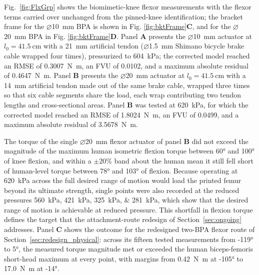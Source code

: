 Fig.~\ref{fig:FlxGrp} shows the biomimetic-knee flexor measurements with the flexor terms carried over unchanged from the pinned-knee identification; the bracket frame for the $\diameter$\qty{10}{\mm} BPA is shown in Fig. \ref{fig:bktFrame}\textbf{C}, and for the $\diameter$\qty{20}{\mm} BPA in Fig. \ref{fig:bktFrame}\textbf{D}. Panel \textbf{A} presents the $\diameter$\qty{10}{\mm} actuator at $l_{0}=\qty{41.5}{\cm}$ with a \qty{21}{\mm} artificial tendon ($\diameter$\qty{1.5}{\mm} Shimano bicycle brake cable wrapped four times), pressurized to \qty{604}{\kPa}; the corrected model reached an RMSE of \qty{0.3007}{\newton\meter}, an FVU of 0.0102, and a maximum absolute residual of \qty{0.4647}{\newton\meter}. Panel \textbf{B} presents the $\diameter$\qty{20}{\mm} actuator at $l_{0}=\qty{41.5}{\cm}$ with a \qty{14}{\mm} artificial tendon made out of the same brake cable, wrapped three times so that six cable segments share the load, each wrap contributing two tendon lengths and cross-sectional areas. Panel \textbf{B} was tested at \qty{620}{\kPa}, for which the corrected model reached an RMSE of \qty{1.8024}{\newton\meter}, an FVU of 0.0499, and a maximum absolute residual of \qty{3.5678}{\newton\meter}.

The torque of the single $\diameter$\qty{20}{\mm} flexor actuator of panel \textbf{B} did not exceed the magnitude of the maximum human isometric flexion torque between \ang{60} and \ang{100} of knee flexion, and within a $\pm 20\%$ band about the human mean it still fell short of human-level torque between \ang{78} and \ang{103} of flexion. Because operating at \qty{620}{\kPa} across the full desired range of motion would load the printed femur beyond its ultimate strength, single points were also recorded at the reduced pressures \qtylist{560;421;325;281}{\kPa}, which show that the desired range of motion is achievable at reduced pressure. This shortfall in flexion torque defines the target that the attachment-route redesign of Section~\ref{sec:ongoing} addresses. Panel \textbf{C} shows the outcome for the redesigned two-BPA flexor route of Section~\ref{sec:redesign_physical}: across its fifteen tested measurements from \ang{-119} to \ang{5}, the measured torque magnitude met or exceeded the human biceps-femoris short-head maximum at every point, with margins from \qty{0.42}{\newton\meter} at \ang{-105} to \qty{17.0}{\newton\meter} at \ang{-14}.

